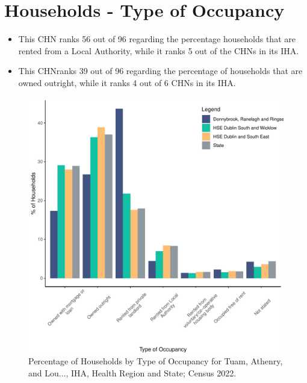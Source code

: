 \documentclass{article}
\begin{document}
\section{Households - Type of Occupancy}\label{sect:Households}
\begin{itemize}
\item This CHN ranks  56 out of 96 regarding the percentage households that are rented from a Local Authority, while it ranks  5 out of the CHNs in its IHA. 
\item This CHNranks  39 out of 96 regarding the percentage of households that are owned outright, while it ranks   4 out of 6 CHNs in its IHA.
\end{itemize}
\begin{figure}[H]
	\centering
	\includegraphics[width = 140mm]{../figures/HouseholdsED.pdf}
	\caption{Percentage of Households by Type of Occupancy for Tuam, Athenry, and Lou..., IHA, Health Region and State; Census 2022.}
	\label{fig:vbnv}
	\end{figure}
\end{document}

